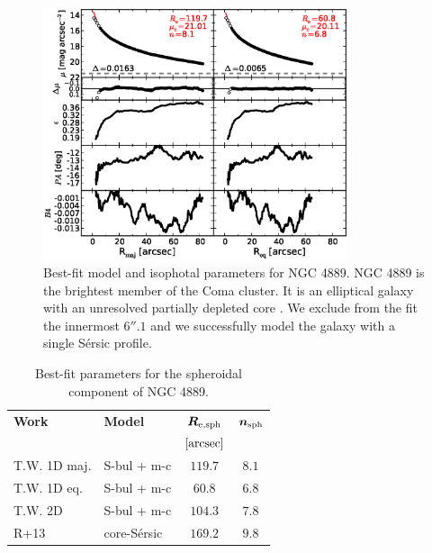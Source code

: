 \documentclass[preprint2]{emulateapj}
\newcommand{\fitfigurewidth}{0.8\textwidth}
\begin{document}
  \begin{figure}[h]
  \begin{center}
  \includegraphics[width=\fitfigurewidth]{images/n4889_1Dfit.eps}
  \caption{Best-fit model and isophotal parameters for NGC 4889.
  NGC 4889 is the brightest member of the Coma cluster. 
  It is an elliptical galaxy with an unresolved partially depleted core \citep{rusli2013}. %
  We exclude from the fit the innermost $6''.1$ and
  we successfully model the galaxy with a single S\'ersic profile.
  }
  \end{center}
  \end{figure}

  \begin{table}[h]
  \small
  \caption{Best-fit parameters for the spheroidal component of NGC 4889.}
  \begin{center}
  \begin{tabular}{llcc}
  \hline
  {\bf Work} & {\bf Model}   & $\bm R_{\rm e,sph}$    & $\bm n_{\rm sph}$ \\
    &  &  $[\rm arcsec]$ & \\
  \hline
  T.W. 1D maj. & S-bul + m-c & $119.7$  &  $8.1$ \\
  T.W. 1D eq.  & S-bul + m-c & $60.8$	&  $6.8$ \\
  T.W. 2D      & S-bul + m-c & $104.3$  &  $7.8$ \\
  \hline
  R+13         & core-S\'ersic & $169.2$  &  $9.8$ \\
  \hline
  \end{tabular}
  \end{center}
  \label{tab:n4889}
  \end{table}
    
\end{document}
